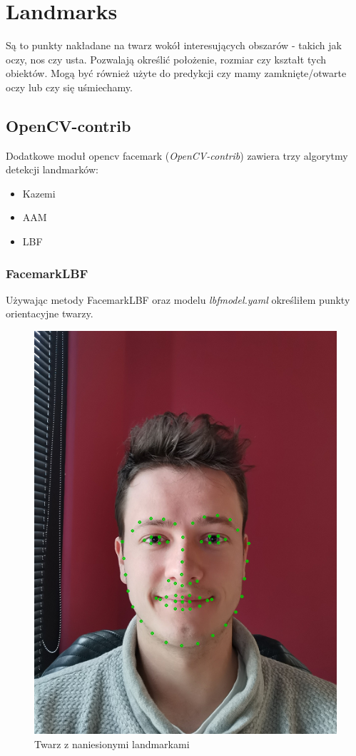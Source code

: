 \newpage

\section{Landmarks} \label{section:landmarks}

Są to punkty nakładane na twarz wokół interesujących obszarów - takich jak oczy, nos czy usta. Pozwalają określić położenie, rozmiar czy kształt tych obiektów. Mogą być również użyte do predykcji czy mamy zamknięte/otwarte oczy lub czy się uśmiechamy. 

\subsection{OpenCV-contrib}
Dodatkowe moduł opencv facemark (\textit{OpenCV-contrib}) zawiera trzy algorytmy detekcji landmarków:

\begin{itemize}
    \item Kazemi
    \item AAM
    \item LBF
\end{itemize}

\subsubsection{FacemarkLBF}

Używając metody FacemarkLBF oraz modelu \textit{lbfmodel.yaml} określiłem punkty orientacyjne twarzy. \cite{landmarkSatyaMallick}

\begin{figure}[!h]
    \begin{center}
        \includegraphics[scale=0.6]{img/landmark_section/landmarks_1.png}
        \caption{Twarz z naniesionymi landmarkami}
        \label{fig:landmarks_1}
    \end{center}
\end{figure}

